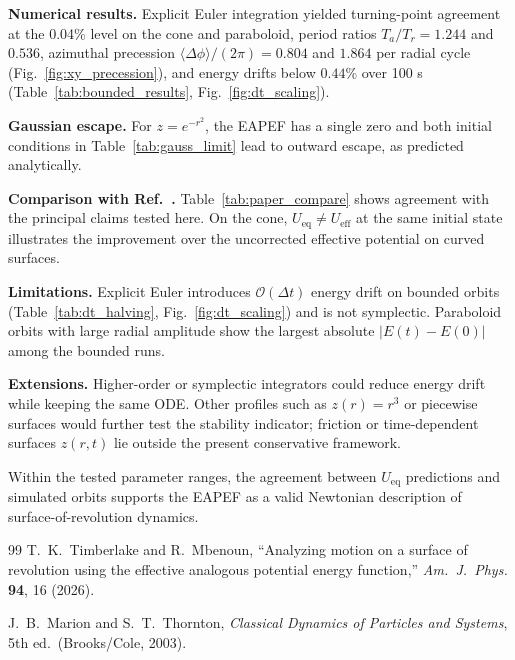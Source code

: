\documentclass[11pt,letterpaper]{article}
\newcommand{\parhead}[1]{\par\medskip\noindent\textbf{#1}\ignorespaces}
\begin{document}
\parhead{Numerical results.}
Explicit Euler integration yielded turning-point agreement at the 0.04\% level on the cone and paraboloid, period ratios $T_a/T_r=1.244$ and $0.536$, azimuthal precession $\langle\Delta\phi\rangle/(2\pi)=0.804$ and $1.864$ per radial cycle (Fig.~\ref{fig:xy_precession}), and energy drifts below $0.44\%$ over 100 s (Table~\ref{tab:bounded_results}, Fig.~\ref{fig:dt_scaling}).

\parhead{Gaussian escape.}
For $z=e^{-r^2}$, the EAPEF has a single zero and both initial conditions in Table~\ref{tab:gauss_limit} lead to outward escape, as predicted analytically.

\parhead{Comparison with Ref.~\cite{ajp2026}.}
Table~\ref{tab:paper_compare} shows agreement with the principal claims tested here. On the cone, $U_{\mathrm{eq}}\ne U_{\mathrm{eff}}$ at the same initial state illustrates the improvement over the uncorrected effective potential on curved surfaces.

\parhead{Limitations.}
Explicit Euler introduces $\mathcal{O}(\Delta t)$ energy drift on bounded orbits (Table~\ref{tab:dt_halving}, Fig.~\ref{fig:dt_scaling}) and is not symplectic. Paraboloid orbits with large radial amplitude show the largest absolute $|E(t)-E(0)|$ among the bounded runs.

\parhead{Extensions.}
Higher-order or symplectic integrators could reduce energy drift while keeping the same ODE. Other profiles such as $z(r)=r^3$ or piecewise surfaces would further test the stability indicator; friction or time-dependent surfaces $z(r,t)$ lie outside the present conservative framework.

Within the tested parameter ranges, the agreement between $U_{\mathrm{eq}}$ predictions and simulated orbits supports the EAPEF as a valid Newtonian description of surface-of-revolution dynamics.

\begin{thebibliography}{99}
T.~K.~Timberlake and R.~Mbenoun,
``Analyzing motion on a surface of revolution using the effective analogous potential energy function,''
\textit{Am.\ J.\ Phys.} \textbf{94}, 16 (2026).

J.~B.~Marion and S.~T.~Thornton,
\textit{Classical Dynamics of Particles and Systems}, 5th ed.\ (Brooks/Cole, 2003).
\end{thebibliography}
\end{document}
